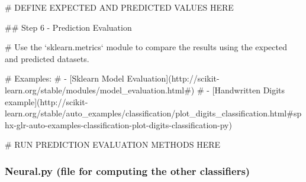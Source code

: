 \documentclass[12pt]{article}
\begin{document}
\begin{python}
# DEFINE EXPECTED AND PREDICTED VALUES HERE

## Step 6 - Prediction Evaluation

# Use the `sklearn.metrics` module to compare the results using the expected and predicted datasets.

# Examples:
# - [Sklearn Model Evaluation](http://scikit-learn.org/stable/modules/model_evaluation.html#)
# - [Handwritten Digits example](http://scikit-learn.org/stable/auto_examples/classification/plot_digits_classification.html#sphx-glr-auto-examples-classification-plot-digits-classification-py)

# RUN PREDICTION EVALUATION METHODS HERE



\end{python}

\subsubsection{Neural.py  (file for computing the other classifiers)}
\end{document}
